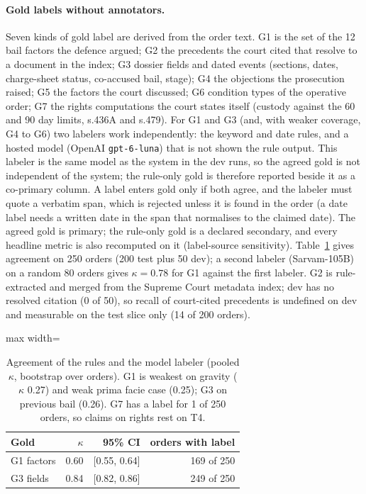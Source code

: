 \paragraph{Gold labels without annotators.} Seven kinds of gold label are derived from the order text. G1 is the set of the 12 bail factors the defence argued; G2 the precedents the court cited that resolve to a document in the index; G3 dossier fields and dated events (sections, dates, charge-sheet status, co-accused bail, stage); G4 the objections the prosecution raised; G5 the factors the court discussed; G6 condition types of the operative order; G7 the rights computations the court states itself (custody against the 60 and 90 day limits, s.436A and s.479). For G1 and G3 (and, with weaker coverage, G4 to G6) two labelers work independently: the keyword and date rules, and a hosted model (OpenAI \texttt{gpt-6-luna}) that is not shown the rule output. This labeler is the same model as the system in the dev runs, so the agreed gold is not independent of the system; the rule-only gold is therefore reported beside it as a co-primary column. A label enters gold only if both agree, and the labeler must quote a verbatim span, which is rejected unless it is found in the order (a date label needs a written date in the span that normalises to the claimed date). The agreed gold is primary; the rule-only gold is a declared secondary, and every headline metric is also recomputed on it (label-source sensitivity). Table~\ref{tab:kappa} gives agreement on 250 orders (200 test plus 50 dev); a second labeler (Sarvam-105B) on a random 80 orders gives $\kappa = 0.78$ for G1 against the first labeler. G2 is rule-extracted and merged from the Supreme Court metadata index; dev has no resolved citation (0 of 50), so recall of court-cited precedents is undefined on dev and measurable on the test slice only (14 of 200 orders).

\begin{table}[!t]
\centering\small
\begin{adjustbox}{max width=\textwidth}
\begin{tabular}{lrrr}
\toprule
Gold & $\kappa$ & 95\% CI & orders with label \\
\midrule
G1 factors & 0.60 & [0.55, 0.64] & 169 of 250 \\
G3 fields & 0.84 & [0.82, 0.86] & 249 of 250 \\
\bottomrule
\end{tabular}
\end{adjustbox}
\caption{Agreement of the rules and the model labeler (pooled $\kappa$, bootstrap over orders). G1 is weakest on gravity ($\kappa$ 0.27) and weak prima facie case (0.25); G3 on previous bail (0.26). G7 has a label for 1 of 250 orders, so claims on rights rest on T4.}
\label{tab:kappa}
\end{table}

